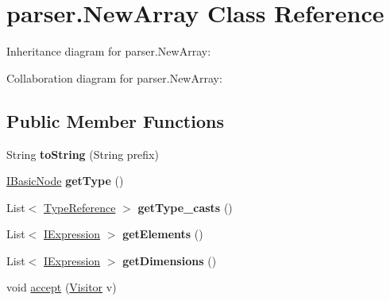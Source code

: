 \hypertarget{classparser_1_1_new_array}{}\section{parser.\+New\+Array Class Reference}
\label{classparser_1_1_new_array}


Inheritance diagram for parser.\+New\+Array\+:


Collaboration diagram for parser.\+New\+Array\+:
\subsection*{Public Member Functions}
\begin{DoxyCompactItemize}
\item 
String {\bfseries to\+String} (String prefix)\hypertarget{classparser_1_1_new_array_a808b8280bc3e9e0ca07fdd4885757642}{}\label{classparser_1_1_new_array_a808b8280bc3e9e0ca07fdd4885757642}

\item 
\hyperlink{interfaceparser_1_1_i_basic_node}{I\+Basic\+Node} {\bfseries get\+Type} ()\hypertarget{classparser_1_1_new_array_a91f9312497f8ead9878fb10ef72ea425}{}\label{classparser_1_1_new_array_a91f9312497f8ead9878fb10ef72ea425}

\item 
List$<$ \hyperlink{classparser_1_1_type_reference}{Type\+Reference} $>$ {\bfseries get\+Type\+\_\+casts} ()\hypertarget{classparser_1_1_new_array_a2945be239314af431679860622308894}{}\label{classparser_1_1_new_array_a2945be239314af431679860622308894}

\item 
List$<$ \hyperlink{interfaceparser_1_1_i_expression}{I\+Expression} $>$ {\bfseries get\+Elements} ()\hypertarget{classparser_1_1_new_array_a5df77d84e817e3f71050393e436a7eb4}{}\label{classparser_1_1_new_array_a5df77d84e817e3f71050393e436a7eb4}

\item 
List$<$ \hyperlink{interfaceparser_1_1_i_expression}{I\+Expression} $>$ {\bfseries get\+Dimensions} ()\hypertarget{classparser_1_1_new_array_a59b0c7597ea5421176591c4bf34d94fa}{}\label{classparser_1_1_new_array_a59b0c7597ea5421176591c4bf34d94fa}

\item 
void \hyperlink{classparser_1_1_new_array_a969e9d6984a92ffeaaded8828fd68e24}{accept} (\hyperlink{interfacemain_1_1_visitor}{Visitor} v)
\end{DoxyCompactItemize}
